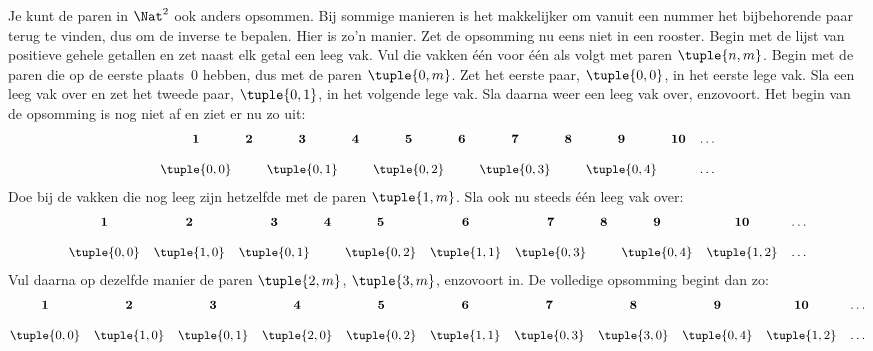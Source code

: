 \documentclass[openany]{memoir}
\begin{document}
\begin{explain}
Je kunt de paren in $\Nat^2$ ook anders opsommen. Bij sommige manieren is het
makkelijker om vanuit een nummer het bijbehorende paar terug te vinden, dus om
de inverse te bepalen. Hier is zo'n manier. Zet de opsomming nu eens niet in
een rooster. Begin met de lijst van positieve gehele getallen en zet naast elk
getal een leeg vak. Vul die vakken één voor één als volgt met paren
$\tuple{n,m}$. Begin met de paren die op de eerste plaats~$0$ hebben, dus met
de paren $\tuple{0,m}$. Zet het eerste paar, $\tuple{0,0}$, in het eerste lege
vak. Sla een leeg vak over en zet het tweede paar, $\tuple{0,1}$, in het
volgende lege vak. Sla daarna weer een leeg vak over, enzovoort. Het begin van
de opsomming is nog niet af en ziet er nu zo uit:
\[\small
\begin{array}{@{}c c c c c c c c c c c@{}}
\mathbf 1 & \mathbf 2 & \mathbf 3 & \mathbf 4 & \mathbf 5 & \mathbf 6 & \mathbf 7 & \mathbf 8 & \mathbf 9 & \mathbf{10} & \dots \\ \\
\tuple{0,0} &  & \tuple{0,1} &  & \tuple{0,2} &  & \tuple{0,3} & & \tuple{0,4} &  & \dots \\
\end{array}
\]
Doe bij de vakken die nog leeg zijn hetzelfde met de paren $\tuple{1,m}$.
Sla ook nu steeds één leeg vak over:
\[\small
\begin{array}{@{}c c c c c c c c c c c@{}}
\mathbf 1 & \mathbf 2 & \mathbf 3 & \mathbf 4 & \mathbf 5 & \mathbf 6 & \mathbf 7 & \mathbf 8 & \mathbf 9 & \mathbf{10} & \dots \\ \\
\tuple{0,0} & \tuple{1,0} & \tuple{0,1} &  & \tuple{0,2} & \tuple{1,1} & 
\tuple{0,3} & & \tuple{0,4} &  \tuple{1,2} & \dots \\
\end{array}
\]
Vul daarna op dezelfde manier de paren $\tuple{2,m}$, $\tuple{3,m}$,
enzovoort in. De volledige opsomming begint dan zo:
\[\small
\begin{array}{@{}cc c c c c c c c c c@{}}
\mathbf 1 & \mathbf 2 & \mathbf 3 & \mathbf 4 & \mathbf 5 & \mathbf 6 & \mathbf 7 & \mathbf 8 & \mathbf 9 & \mathbf{10} & \dots \\ \\
\tuple{0,0} & \tuple{1,0} & \tuple{0,1} & \tuple{2,0}  & \tuple{0,2} & 
\tuple{1,1} & \tuple{0,3} & \tuple{3,0}  & \tuple{0,4} &  \tuple{1,2} & \dots \\
\end{array}
\]
\end{explain}
\end{document}
